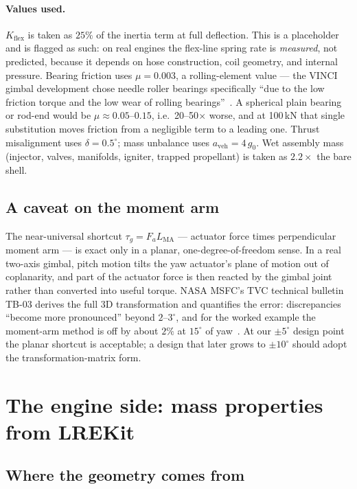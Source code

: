 \documentclass[11pt]{article}
\begin{document}
\paragraph{Values used.} $K_{\text{flex}}$ is taken as $25\%$ of the inertia
term at full deflection. This is a placeholder and is flagged as such:
on real engines the flex-line spring rate is \emph{measured}, not predicted,
because it depends on hose construction, coil geometry, and internal
pressure. Bearing friction uses $\mu = 0.003$, a rolling-element value ---
the VINCI gimbal development chose needle roller bearings specifically
``due to the low friction torque and the low wear of rolling
bearings''~\cite{neugebauer2006}. A spherical plain bearing or rod-end
would be $\mu \approx 0.05$--$0.15$, i.e.\ 20--50$\times$ worse, and at
100\,kN that single substitution moves friction from a negligible term
to a leading one. Thrust misalignment uses $\delta = 0.5^\circ$; mass
unbalance uses $a_{\text{veh}} = 4\,g_0$. Wet assembly mass (injector,
valves, manifolds, igniter, trapped propellant) is taken as $2.2\times$
the bare shell.

\subsection{A caveat on the moment arm}

The near-universal shortcut $\tau_g = F_a L_{\text{MA}}$ --- actuator force
times perpendicular moment arm --- is exact only in a planar, one-degree-of-freedom
sense. In a real two-axis gimbal, pitch motion tilts the yaw actuator's plane
of motion out of coplanarity, and part of the actuator force is then reacted
by the gimbal joint rather than converted into useful torque. NASA MSFC's
TVC technical bulletin TB-03 derives the full 3D transformation and quantifies
the error: discrepancies ``become more pronounced'' beyond $2$--$3^\circ$,
and for the worked example the moment-arm method is off by about $2\%$ at
$15^\circ$ of yaw~\cite{stepp2024}. At our $\pm5^\circ$ design point the
planar shortcut is acceptable; a design that later grows to $\pm10^\circ$
should adopt the transformation-matrix form.

\section{The engine side: mass properties from LREKit}
\label{sec:engine}

\subsection{Where the geometry comes from}
\end{document}
